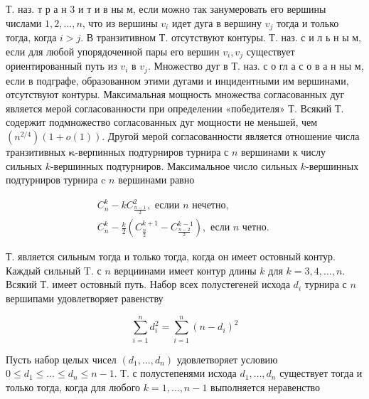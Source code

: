 \documentclass[10pt]{article}
\begin{document}
Т. наз. т р а н 3 и т и в ны м, если можно так занумеровать его вершины числами $1,2, \ldots, n$, что из вершины $v_{i}$ идет дуга в вершину $v_{j}$ тогда и только тогда, когда $i>j$. В транзитивном Т. отсутствуют контуры. Т. наз. с и л ь н ы м, если для любой упорядоченной пары его вершин $v_{i}, v_{j}$ существует ориентированный путь из $v_{i}$ в $v_{j}$. Множество дуг в Т. наз. с о гл а с о в а н ны м, если в подграфе, образованном этими дугами и инцидентными им вершинами, отсутствуют контуры. Максимальная мощность множества согласованных дуг является мерой согласованности при определении «победителя» Т. Всякий Т. содержит подмножество согласованных дуг мощности не меньшей, чем $\left(n^{2 / 4}\right)(1+o(1))$. Другой мерой согласованности является отношение числа транзитивных $\boldsymbol{\kappa}$-верпинных подтурниров турнира с $n$ вершинами к числу сильных $k$-вершинных подтурниров. Максимальное число сильных $k$-вершинных подтурниров турнира c $n$ вершинами равно



\[

\begin{gathered}

C_{n}^{k}-k C_{\frac{n-1}{2}}^{2}, \text { еслии } n \text { нечетно, } \\

C_{n}^{k}-\frac{k}{2}\left(C_{\frac{n}{2}}^{k+1}-C_{\frac{n-2}{2}}^{k-1}\right), \text { если } n \text { четно. }

\end{gathered}

\]



Т. является сильным тогда и только тогда, когда он имеет остовный контур. Каждый сильный $\mathrm{T}$. с $n$ верциинами имеет контур длины $k$ для $k=3,4, \ldots, n$. Всякий Т. имеет остовный путь. Набор всех полустегеней исхода $d_{i}$ турнира с $n$ вершипами удовлетворяет равенству



\[

\sum_{i=1}^{n} d_{i}^{2}=\sum_{i=1}^{n}\left(n-d_{i}\right)^{2}

\]



Пусть набор целых чисел $\left(d_{1}, \ldots, d_{n}\right)$ удовлетворяет условию $0 \leqslant d_{1} \leqslant \ldots \leqslant d_{n} \leqslant n-1$. Т. с полустепенями исхода $d_{1}, \ldots, d_{n}$ существует тогда и только тогда, когда для любого $k=1, \ldots, n-1$ выполняется неравенство
\end{document}
